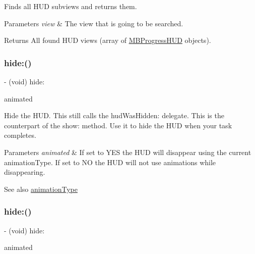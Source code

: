 Finds all H\+UD subviews and returns them.


\begin{DoxyParams}{Parameters}
{\em view} & The view that is going to be searched. \\
\hline
\end{DoxyParams}
\begin{DoxyReturn}{Returns}
All found H\+UD views (array of \mbox{\hyperlink{interface_m_b_progress_h_u_d}{M\+B\+Progress\+H\+UD}} objects). 
\end{DoxyReturn}
\mbox{\label{interface_m_b_progress_h_u_d_a500fd79859e56cf98fd2eebfd37b4204}} 
\subsubsection{\texorpdfstring{hide\+:()}{hide:()}\hspace{0.1cm}{\footnotesize\ttfamily [1/3]}}
{\footnotesize\ttfamily -\/ (void) hide\+: \begin{DoxyParamCaption}\item[{(B\+O\+OL)}]{animated }\end{DoxyParamCaption}}

Hide the H\+UD. This still calls the hud\+Was\+Hidden\+: delegate. This is the counterpart of the show\+: method. Use it to hide the H\+UD when your task completes.


\begin{DoxyParams}{Parameters}
{\em animated} & If set to Y\+ES the H\+UD will disappear using the current animation\+Type. If set to NO the H\+UD will not use animations while disappearing.\\
\hline
\end{DoxyParams}
\begin{DoxySeeAlso}{See also}
\mbox{\hyperlink{interface_m_b_progress_h_u_d_a71d04bb9e2839df9377ad10d03b2e468}{animation\+Type}} 
\end{DoxySeeAlso}
\mbox{\label{interface_m_b_progress_h_u_d_a500fd79859e56cf98fd2eebfd37b4204}} 
\subsubsection{\texorpdfstring{hide\+:()}{hide:()}\hspace{0.1cm}{\footnotesize\ttfamily [2/3]}}
{\footnotesize\ttfamily -\/ (void) hide\+: \begin{DoxyParamCaption}\item[{(B\+O\+OL)}]{animated }\end{DoxyParamCaption}}

